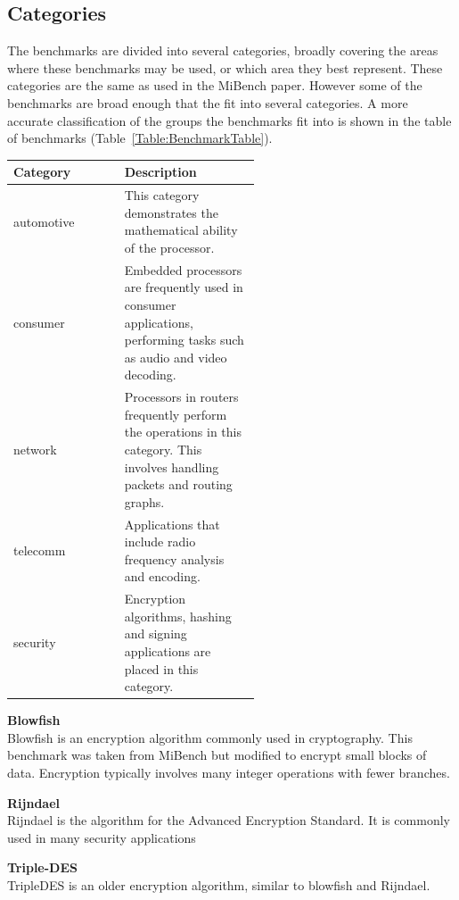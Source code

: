 \documentclass[twocolumn]{article}
\begin{document}
\subsection*{Categories}

The benchmarks are divided into several categories, broadly covering the areas where these benchmarks may be used, or which area they best represent. These categories are the same as used in the MiBench paper. However some of the benchmarks are broad enough that the fit into several categories. A more accurate classification of the groups the benchmarks fit into is shown in the table of benchmarks (Table~\ref{Table:BenchmarkTable}).

\begin{center}
	\begin{tabular}{l p{0.55\linewidth}}
		Category &	Description \\
		\hline
		automotive 	& This category demonstrates the mathematical ability of the processor. \\
		consumer	& Embedded processors are frequently used in consumer applications, performing tasks such as audio and video decoding. \\
		network		& Processors in routers frequently perform the operations in this category. This involves handling packets and routing graphs. \\
		telecomm	& Applications that include radio frequency analysis and encoding. \\
		security	& Encryption algorithms, hashing and signing applications are placed in this category. \\
	\end{tabular}
\end{center}

\vspace{3mm}
\textbf{Blowfish}\\
Blowfish is an encryption algorithm commonly used in cryptography. This benchmark was taken from MiBench but modified to encrypt small blocks of data. Encryption typically involves many integer operations with fewer branches.

\vspace{3mm}
\textbf{Rijndael}\\
Rijndael is the algorithm for the Advanced Encryption Standard. It is commonly used in many security applications

\vspace{3mm}
\textbf{Triple-DES}\\
TripleDES is an older encryption algorithm, similar to blowfish and Rijndael.
\end{document}
